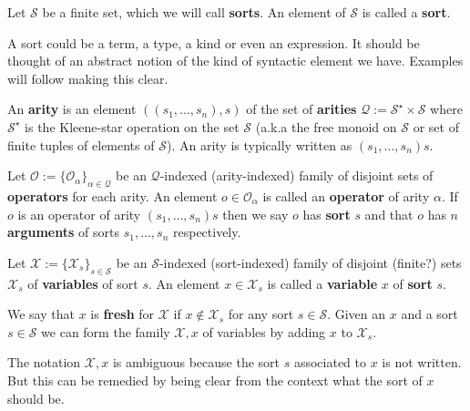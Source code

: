 \begin{defin}[Sorts]
    Let $\mathcal{S}$ be a finite set, which we will call \textbf{sorts}. An element of $\mathcal{S}$ is called a \textbf {sort}.
\end{defin}

A sort could be a term, a type, a kind or even an expression. It should be thought of an abstract notion of the kind of syntactic element we have. Examples will follow making this clear.

\begin{defin}[Arities]
    An \textbf{arity} is an element $((s_1,\dots,s_n),s)$ of the set of \textbf{arities} $\mathcal{Q}:=\mathcal{S}^\star \times \mathcal{S}$ where $\mathcal{S}^\star$ is the Kleene-star operation on the set $\mathcal{S}$ (a.k.a the free monoid on $\mathcal{S}$ or set of finite tuples of elements of $\mathcal{S}$). An arity is typically written as $(s_1,\dots,s_n)s$. 
\end{defin}

\begin{defin}[Operators]
    Let $\mathcal{O} :=\{ \mathcal{O}_\alpha \}_{\alpha \in \mathcal{Q}}$ be an $\mathcal{Q}$-indexed (arity-indexed) family of disjoint sets of \textbf{operators} for each arity. An element $o \in \mathcal{O}_\alpha$ is called an \textbf{operator} of arity $\alpha$. If $o$ is an operator of arity $(s_1,\dots,s_n)s$ then we say $o$ has \textbf{sort} $s$ and that $o$ has $n$ \textbf{arguments} of sorts $s_1,\dots,s_n$ respectively.
\end{defin}

\begin{defin}[Variables]
    Let $\mathcal{X}:= \{ \mathcal{X}_s\}_{s \in \mathcal{S}}$ be an $\mathcal{S}$-indexed (sort-indexed) family of disjoint (finite?) sets $\mathcal{X}_s$ of \textbf{variables} of sort $s$. An element $x\in\mathcal{X}_s$ is called a \textbf{variable} $x$ of \textbf{sort} $s$. 
\end{defin}

\begin{defin}
    We say that $x$ is \textbf{fresh} for $\mathcal{X}$ if $x \not\in \mathcal{X}_s$ for any sort $s\in \mathcal{S}$. Given an $x$ and a sort $s\in \mathcal{S}$ we can form the family $\mathcal{X},x$ of variables by adding $x$ to $\mathcal{X}_s$. 
\end{defin}

\begin{remark}
    The notation $\mathcal{X},x$ is ambiguous because the sort $s$ associated to $x$ is not written. But this can be remedied by being clear from the context what the sort of $x$ should be.
\end{remark}

